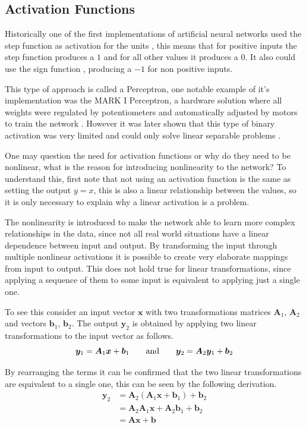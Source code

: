 \subsection{Activation Functions}
Historically one of the first implementations of artificial neural networks used the step function as activation for the units \cite[Chapter 1]{NN&DL2015}, this means that for positive inputs the step function produces a $1$ and for all other values it produces a $0$. It also could use the sign function \cite{thePerceptron2017}, producing a $-1$ for non positive inputs.

This type of approach is called a Perceptron, one notable example of it's implementation was the MARK I Perceptron, a hardware solution where all weights were regulated by potentiometers and automatically adjusted by motors to train the network \cite{perceptron1960}. However it was later shown that this type of binary activation was very limited and could only solve linear separable problems \cite{thePerceptron2017}.

One may question the need for activation functions or why do they need to be nonlinear, what is the reason for introducing nonlinearity to the network? To understand this, first note that not using an activation function is the same as setting the output $y = x$, this is also a linear relationship between the values, so it is only necessary to explain why a linear activation is a problem.

The nonlinearity is introduced to make the network able to learn more complex relationships in the data, since not all real world situations have a linear dependence between input and output. By transforming the input through multiple nonlinear activations it is possible to create very elaborate mappings from input to output. This does not hold true for linear transformations, since applying a sequence of them to some input is equivalent to applying just a single one.

To see this consider an input vector $\bm{x}$ with two transformations matrices $\bm{A}_1$, $\bm{A}_2$ and vectors $\bm{b}_1$, $\bm{b}_2$. The output $\bm{y}_2$ is obtained by applying two linear transformations to the input vector as follows.
\begin{equation} \label{eq:linearity_1}
    \bm{y}_1 = \bm{A}_1 \bm{x} + \bm{b}_1
    \qquad \text{and} \qquad
    \bm{y}_2 = \bm{A}_2 \bm{y}_1 + \bm{b}_2 \\
\end{equation}

By rearranging the terms it can be confirmed that the two linear transformations are equivalent to a single one, this can be seen by the following derivation.
\begin{align*}
    \bm{y}_2& = \bm{A}_2 (\bm{A}_1 \bm{x} + \bm{b}_1) + \bm{b}_2 \\
    & = \bm{A}_2 \bm{A}_1 \bm{x} +  \bm{A}_2 \bm{b}_1 + \bm{b}_2 \\
    & = \bm{A} \bm{x} + \bm{b}
\end{align*}

